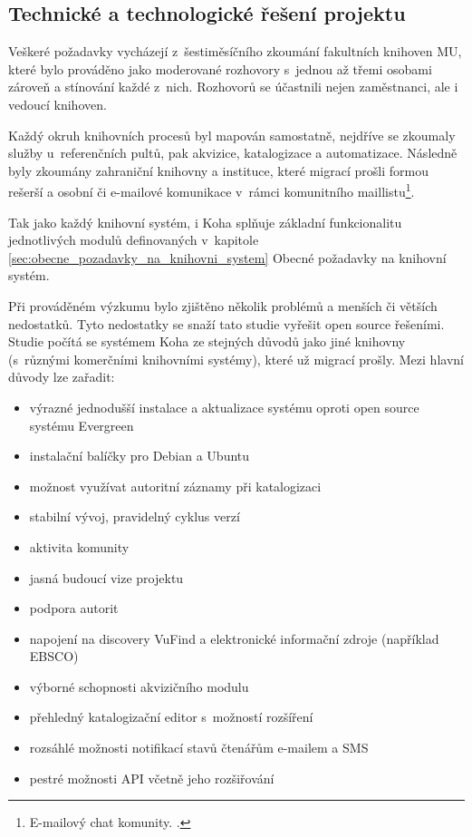 \documentclass[
	11pt, oneside, printed, final, palatino, monochrome
	microtype,
	table,   %
	lof,     %
	lot     %
]{fithesis3}
\begin{document}
{\subsection{Technické a technologické řešení projektu}

Veškeré požadavky vycházejí z~šestiměsíčního zkoumání fakultních knihoven MU, které bylo prováděno jako moderované rozhovory s~jednou až třemi osobami zároveň a stínování každé z~nich. Rozhovorů se účastnili nejen zaměstnanci, ale i vedoucí knihoven. 

Každý okruh knihovních procesů byl mapován samostatně, nejdříve se zkoumaly služby u~referenčních pultů, pak akvizice, katalogizace a automatizace. Následně byly zkoumány zahraniční knihovny a instituce, které migrací prošli formou rešerší a osobní či e-mailové komunikace v~rámci komunitního maillistu\footnote{E-mailový chat komunity.
.}. 

Tak jako každý knihovní systém, i Koha splňuje základní funkcionalitu jednotlivých modulů definovaných v~kapitole \ref{sec:obecne_pozadavky_na_knihovni_system} Obecné požadavky na knihovní systém.

Při prováděném výzkumu bylo zjištěno několik problémů a menších či větších nedostatků. Tyto nedostatky se snaží tato studie vyřešit open source řešeními. Studie počítá se systémem Koha ze stejných důvodů jako jiné knihovny (s~různými komerčními knihovními systémy), které už migrací prošly. Mezi hlavní důvody lze zařadit: 

\begin{itemize}
\item výrazné jednodušší instalace a aktualizace systému oproti open source systému Evergreen
\item instalační balíčky pro Debian a Ubuntu
\item možnost využívat autoritní záznamy při katalogizaci
\item stabilní vývoj, pravidelný cyklus verzí
\item aktivita komunity
\item jasná budoucí vize projektu
\item podpora autorit
\item napojení na discovery VuFind a elektronické informační zdroje (například EBSCO)
\item výborné schopnosti akvizičního modulu
\item přehledný katalogizační editor s~možností rozšíření
\item rozsáhlé možnosti notifikací stavů čtenářům e-mailem a SMS
\item pestré možnosti API včetně jeho rozšiřování
\end{itemize}

}
\end{document}
